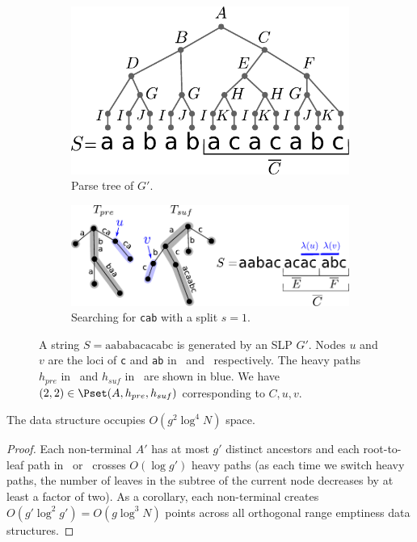 \begin{figure}
\centering
\captionsetup[subfigure]{justification=centering}
\begin{subfigure}[b]{0.4\textwidth}
\centering
\includegraphics[width=\textwidth]{Part_One/index_gapped/figures/ex_parse_tree.pdf}
\caption{Parse tree of $G'$.}
\end{subfigure}
\hfill
\begin{subfigure}[b]{0.58\textwidth}
\centering
\includegraphics[width=\textwidth]{Part_One/index_gapped/figures/ex_Tpre_Tsuf.pdf}
\caption{Searching for \texttt{cab} with a split $s=1$.}
\end{subfigure}
\caption{A string $S=\mathrm{aababacacabc}$ is generated by an SLP $G'$. Nodes $u$ and $v$ are the loci of \texttt{c} and \texttt{ab} in \Tpre\  and \Tsuf\, respectively. The heavy paths $h_{pre}$ in \Tpre\ and $h_{suf}$ in \Tsuf\ are shown in blue. We have $(2,2) \in \Pset(A,h_{pre},h_{suf})$ corresponding to $C,u,v$.}
\label{fig:occurrences}
\end{figure}

\begin{claim}\label{claim:space-all}
The data structure occupies $O(g^2 \log^4 N)$ space.
\end{claim}
\begin{proof}
Each non-terminal $A'$ has at most $g'$ distinct ancestors and each root-to-leaf path in \Tpre\ or \Tsuf\ crosses $O(\log g')$ heavy paths (as each time we switch heavy paths, the number of leaves in the subtree of the current node decreases by at least a factor of two). As a corollary, each non-terminal creates $O(g' \log^2 g') = O(g \log^3 N)$ points across all orthogonal range emptiness data structures. 
\end{proof}


